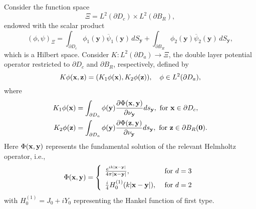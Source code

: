 \documentclass[11pt]{amsart}
\theoremstyle{definition}
\theoremstyle{definition}
\theoremstyle{definition}
\def\Bx{{\bf x}}
\def\By{{\bf y}}
\def\Bz{{\bf z}}
\def\B0{{\bf 0}}
\begin{document}
Consider the function space
\begin{equation*}
\Xi = L^{2}(\partial D_{c}) \times L^{2}(\partial B_{R}),
\end{equation*}
endowed with the scalar product
\begin{equation}
(\phi,\psi)_{\Xi} = \int_{\partial D_{c}}\phi_{1}(\mathbf{y})\overline{\psi}_{1}(\mathbf{y})\,dS_{\mathbf{y}} + \int_{\partial B_{R}} \phi_{2}(\mathbf{y})\overline{\psi}_{2}(\mathbf{y})\,dS_{\mathbf{y}},
\end{equation}
which is a Hilbert space. Consider $K: L^{2}(\partial D_{a}) \to \Xi$, the double layer potential operator restricted to $\partial D_{c}$ and $\partial B_{R}$, respectively, defined by
\begin{equation}
\label{EQ:K}
K\phi(\Bx,\Bz) =  (K_{1}\phi(\Bx), K_{2}\phi(\Bz)), \quad \phi \in L^{2}(\partial D_{a}),
\end{equation}
where
\begin{align*}
K_1\phi(\Bx) & = \int_{\partial D_{a}}\phi(\By)\frac{\partial
\Phi(\Bx,\By)}{\partial \mathbf{\nu}_{\mathbf{y}}}ds_{\By}, \mbox{ for }\Bx\in
\partial D_c,\nonumber\\
K_2\phi(\Bz) & = \int_{\partial D_{a}}\phi(\By)\frac{\partial
\Phi(\Bz,\By)}{\partial \mathbf{\nu}_{\mathbf{y}}}ds_{\By}, \mbox{ for }\Bz\in
\partial B_R(\B0).
\end{align*}
Here $\Phi(\Bx, \By)$ represents the fundamental solution of the relevant Helmholtz operator, i.e.,
\begin{equation}
\Phi(\Bx,\By) = \left\{\begin{array}{ll}
\frac{e^{ik|\Bx-\By|}}{4\pi|\Bx-\By|}, & \mbox{ for } d=3\vspace{0.15cm}\\
\frac{i}{4}H_0^{(1)}(k|\Bx-\By|), & \mbox{ for } d=2\end{array}\right.
\end{equation}
with $H_{0}^{(1)} = J_{0} + iY_{0}$ representing the Hankel function of first type.
\end{document}
